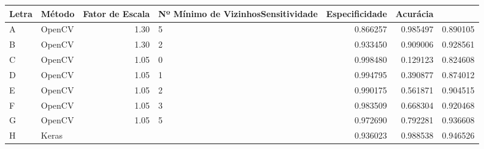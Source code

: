 \begin{tabular}{llrlrrr}
Letra & Método & Fator de Escala & Nº Mínimo de VizinhosSensitividade & Especificidade & Acurácia \\
\midrule
     A &  OpenCV &    1.30 &               5 &                            0.866257 &        0.985497 &  0.890105 \\
     B &  OpenCV &    1.30 &               2 &                            0.933450 &        0.909006 &  0.928561 \\
     C &  OpenCV &    1.05 &               0 &                            0.998480 &        0.129123 &  0.824608 \\
     D &  OpenCV &    1.05 &               1 &                            0.994795 &        0.390877 &  0.874012 \\
     E &  OpenCV &    1.05 &               2 &                            0.990175 &        0.561871 &  0.904515 \\
     F &  OpenCV &    1.05 &               3 &                            0.983509 &        0.668304 &  0.920468 \\
     G &  OpenCV &    1.05 &               5 &                            0.972690 &        0.792281 &  0.936608 \\
     H &   Keras &         &                 &                            0.936023 &        0.988538 &  0.946526 \\
\end{tabular}
